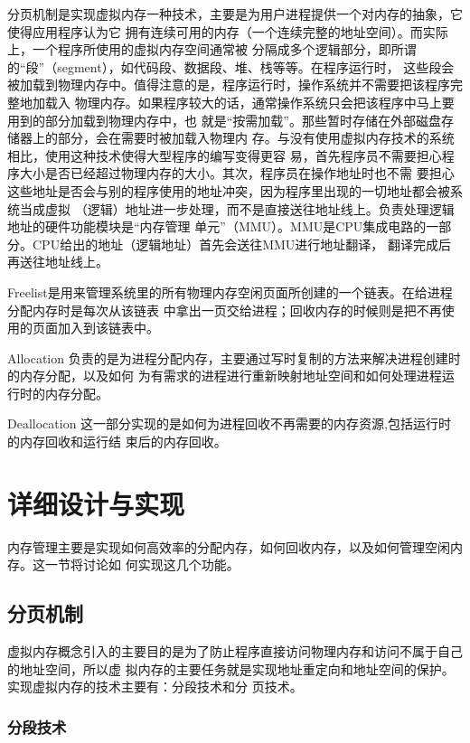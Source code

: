 \documentclass{swfuthesism}
\begin{document}
分页机制是实现虚拟内存一种技术，主要是为用户进程提供一个对内存的抽象，它使得应用程序认为它
拥有连续可用的内存（一个连续完整的地址空间）。而实际上，一个程序所使用的虚拟内存空间通常被
分隔成多个逻辑部分，即所谓的``段''（segment），如代码段、数据段、堆、栈等等。在程序运行时，
这些段会被加载到物理内存中。值得注意的是，程序运行时，操作系统并不需要把该程序完整地加载入
物理内存。如果程序较大的话，通常操作系统只会把该程序中马上要用到的部分加载到物理内存中，也
就是``按需加载''。那些暂时存储在外部磁盘存储器上的部分，会在需要时被加载入物理内
存\cite{Bhat2017}。与没有使用虚拟内存技术的系统相比，使用这种技术使得大型程序的编写变得更容
易，首先程序员不需要担心程序大小是否已经超过物理内存的大小。其次，程序员在操作地址时也不需
要担心这些地址是否会与别的程序使用的地址冲突，因为程序里出现的一切地址都会被系统当成虚拟
（逻辑）地址进一步处理，而不是直接送往地址线上。负责处理逻辑地址的硬件功能模块是``内存管理
单元''（MMU）。MMU是CPU集成电路的一部分。CPU给出的地址（逻辑地址）首先会送往MMU进行地址翻译，
翻译完成后再送往地址线上\cite{abhishek2002memory,Thompson78uniximplementation}。

Freelist是用来管理系统里的所有物理内存空闲页面所创建的一个链表。在给进程分配内存时是每次从该链表
中拿出一页交给进程；回收内存的时候则是把不再使用的页面加入到该链表中。

Allocation 负责的是为进程分配内存，主要通过写时复制的方法来解决进程创建时的内存分配，以及如何
为有需求的进程进行重新映射地址空间和如何处理进程运行时的内存分配。

Deallocation 这一部分实现的是如何为进程回收不再需要的内存资源,包括运行时的内存回收和运行结
束后的内存回收。

\section{详细设计与实现}

内存管理主要是实现如何高效率的分配内存，如何回收内存，以及如何管理空闲内存。这一节将讨论如
何实现这几个功能。

\subsection{分页机制}

虚拟内存概念引入的主要目的是为了防止程序直接访问物理内存和访问不属于自己的地址空间，所以虚
拟内存的主要任务就是实现地址重定向和地址空间的保护。实现虚拟内存的技术主要有：分段技术和分
页技术。

\subsubsection{分段技术}
\end{document}
